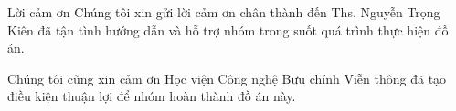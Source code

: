 \begin{preface}{Lời cảm ơn}
Chúng tôi xin gửi lời cảm ơn chân thành đến Ths. Nguyễn Trọng Kiên đã tận tình hướng dẫn và hỗ trợ nhóm trong suốt quá trình thực hiện đồ án.

Chúng tôi cũng xin cảm ơn Học viện Công nghệ Bưu chính Viễn thông đã tạo điều kiện thuận lợi để nhóm hoàn thành đồ án này.
\end{preface}
